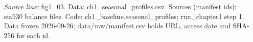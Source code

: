 {\scriptsize\textit{Source line:} fig1\_\allowbreak{}03. Data: ch1\_\allowbreak{}seasonal\_\allowbreak{}profiles.csv. Sources (manifest ids): eia930 balance files. Code: ch1\_\allowbreak{}baseline.seasonal\_\allowbreak{}profiles; run\_\allowbreak{}chapter1 step 1. Data frozen 2026-09-26; data/raw/manifest.csv holds URL, access date and SHA-256 for each id.}